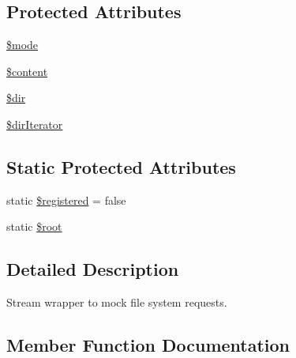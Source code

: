 \subsection*{Protected Attributes}
\begin{DoxyCompactItemize}
\item 
\mbox{\hyperlink{classorg_1_1bovigo_1_1vfs_1_1vfs_stream_wrapper_a3aaf40baac36e278c7d7c9139df1750c}{\$mode}}
\item 
\mbox{\hyperlink{classorg_1_1bovigo_1_1vfs_1_1vfs_stream_wrapper_a57b284fe00866494b33afa80ba729bed}{\$content}}
\item 
\mbox{\hyperlink{classorg_1_1bovigo_1_1vfs_1_1vfs_stream_wrapper_a1659f0a629d408e0f849dbe4ee061e62}{\$dir}}
\item 
\mbox{\hyperlink{classorg_1_1bovigo_1_1vfs_1_1vfs_stream_wrapper_a5defe09d5cbd54a8ccc5445596652d06}{\$dir\+Iterator}}
\end{DoxyCompactItemize}
\subsection*{Static Protected Attributes}
\begin{DoxyCompactItemize}
\item 
static \mbox{\hyperlink{classorg_1_1bovigo_1_1vfs_1_1vfs_stream_wrapper_a4832303f9bd07af05f1ec6874de46716}{\$registered}} = false
\item 
static \mbox{\hyperlink{classorg_1_1bovigo_1_1vfs_1_1vfs_stream_wrapper_ab37f7c32f41c3c61ed940887453767f4}{\$root}}
\end{DoxyCompactItemize}


\subsection{Detailed Description}
Stream wrapper to mock file system requests. 

\subsection{Member Function Documentation}
\mbox{\label{classorg_1_1bovigo_1_1vfs_1_1vfs_stream_wrapper_ad3053de108475dc3073642dbfa5634d5}} 
